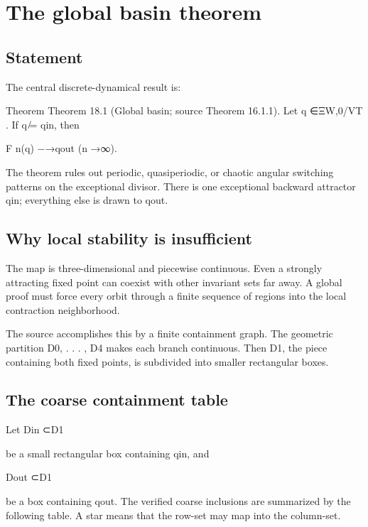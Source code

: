 \chapter{The global basin theorem}
\section{Statement}

The central discrete-dynamical result is:


\begin{statementbox}{Theorem}
Theorem 18.1 (Global basin; source Theorem 16.1.1). Let q ∈ΞW,0/VT . If q ̸= qin, then
\end{statementbox}

\begin{displaytext}
F n(q) −→qout (n →∞).
\end{displaytext}

The theorem rules out periodic, quasiperiodic, or chaotic angular switching patterns on the exceptional divisor. There is one exceptional backward attractor qin; everything else is drawn to qout.


\section{Why local stability is insufficient}

The map is three-dimensional and piecewise continuous. Even a strongly attracting fixed point can coexist with other invariant sets far away. A global proof must force every orbit through a finite sequence of regions into the local contraction neighborhood.


The source accomplishes this by a finite containment graph. The geometric partition D0, . . . , D4 makes each branch continuous. Then D1, the piece containing both fixed points, is subdivided into smaller rectangular boxes.


\section{The coarse containment table}

Let Din ⊂D1


be a small rectangular box containing qin, and


Dout ⊂D1


be a box containing qout. The verified coarse inclusions are summarized by the following table. A star means that the row-set may map into the column-set.


